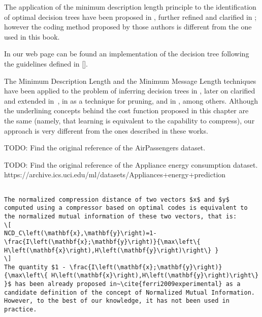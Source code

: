 The application of the minimum description length principle to the identification of optimal decision trees have been proposed in \cite{quinlan1989inferring}, further refined and clarified in \cite{wallace1993coding}; however the coding method proposed by those authors is different from the one used in this book.

In our web page can be found an implementation of the decision tree following the guidelines defined in []. 


The Minimum Description Length \cite{grunwald2007minimum} and the Minimum Message Length \cite{wallace2005statistical} techniques have been applied to the problem of inferring decision trees in \cite{quinlan1989inferring}, later on clarified and extended in~\cite{wallace1993coding}, in \cite{mehta1995mdl} as a technique for pruning, and in \cite{rastogi1998public}, among others. Although the underlining concepts behind the cost function proposed in this chapter are the same (namely, that learning is equivalent to the capability to compress), our approach is very different from the ones described in these works.



{\color{red} TODO: Find the original reference of the AirPassengers dataset.}

{\color{red} TODO: Find the original reference of the Appliance energy consumption dataset. https://archive.ics.uci.edu/ml/datasets/Appliances+energy+prediction}


\begin{verbatim}

The normalized compression distance of two vectors $x$ and $y$ computed using a compressor based on optimal codes is equivalent to the normalized mutual information of these two vectors, that is:
\[
NCD_C\left(\mathbf{x},\mathbf{y}\right)=1-\frac{I\left(\mathbf{x};\mathbf{y}\right)}{\max\left\{ H\left(\mathbf{x}\right),H\left(\mathbf{y}\right)\right\} }
\]
The quantity $1 - \frac{I\left(\mathbf{x};\mathbf{y}\right)}{\max\left\{ H\left(\mathbf{x}\right),H\left(\mathbf{y}\right)\right\} }$ has been already proposed in~\cite{ferri2009experimental} as a candidate definition of the concept of Normalized Mutual Information. However, to the best of our knowledge, it has not been used in practice.

\end{verbatim}